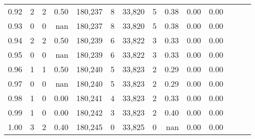 \begin{tabular}{rrrrrrrrrrrrrr}
0.92 &      2 &    2 &  0.50 &  180,237 &        8 &  33,820 &       5 &  0.38 &  0.00 &      0.00 \\
0.93 &      0 &    0 &   nan &  180,237 &        8 &  33,820 &       5 &  0.38 &  0.00 &      0.00 \\
0.94 &      2 &    2 &  0.50 &  180,239 &        6 &  33,822 &       3 &  0.33 &  0.00 &      0.00 \\
0.95 &      0 &    0 &   nan &  180,239 &        6 &  33,822 &       3 &  0.33 &  0.00 &      0.00 \\
0.96 &      1 &    1 &  0.50 &  180,240 &        5 &  33,823 &       2 &  0.29 &  0.00 &      0.00 \\
0.97 &      0 &    0 &   nan &  180,240 &        5 &  33,823 &       2 &  0.29 &  0.00 &      0.00 \\
0.98 &      1 &    0 &  0.00 &  180,241 &        4 &  33,823 &       2 &  0.33 &  0.00 &      0.00 \\
0.99 &      1 &    0 &  0.00 &  180,242 &        3 &  33,823 &       2 &  0.40 &  0.00 &      0.00 \\
1.00 &      3 &    2 &  0.40 &  180,245 &        0 &  33,825 &       0 &   nan &  0.00 &      0.00 \\
\bottomrule
\end{tabular}
